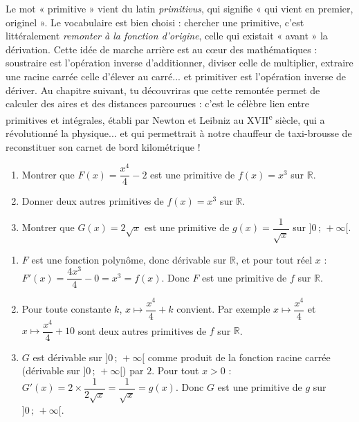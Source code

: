 \documentclass[11pt]{article}
\begin{document}
\begin{savaistu}
Le mot « primitive » vient du latin \emph{primitivus}, qui signifie « qui vient en premier, originel ». Le vocabulaire est bien choisi : chercher une primitive, c'est littéralement \emph{remonter à la fonction d'origine}, celle qui existait « avant » la dérivation. Cette idée de marche arrière est au cœur des mathématiques : soustraire est l'opération inverse d'additionner, diviser celle de multiplier, extraire une racine carrée celle d'élever au carré... et primitiver est l'opération inverse de dériver. Au chapitre suivant, tu découvriras que cette remontée permet de calculer des aires et des distances parcourues : c'est le célèbre lien entre primitives et intégrales, établi par Newton et Leibniz au XVII\textsuperscript{e} siècle, qui a révolutionné la physique... et qui permettrait à notre chauffeur de taxi-brousse de reconstituer son carnet de bord kilométrique !
\end{savaistu}

\begin{exercice}
\begin{enumerate}
\item Montrer que $F(x) = \dfrac{x^4}{4} - 2$ est une primitive de $f(x) = x^3$ sur $\mathbb{R}$.
\item Donner deux autres primitives de $f(x) = x^3$ sur $\mathbb{R}$.
\item Montrer que $G(x) = 2\sqrt{x}$ est une primitive de $g(x) = \dfrac{1}{\sqrt{x}}$ sur $]0\,;\,+\infty[$.
\end{enumerate}
\end{exercice}

\begin{corrige}
\begin{enumerate}
\item $F$ est une fonction polynôme, donc dérivable sur $\mathbb{R}$, et pour tout réel $x$ : $F'(x) = \dfrac{4x^3}{4} - 0 = x^3 = f(x)$. Donc $F$ est une primitive de $f$ sur $\mathbb{R}$.
\item Pour toute constante $k$, $x \mapsto \dfrac{x^4}{4} + k$ convient. Par exemple $x \mapsto \dfrac{x^4}{4}$ et $x \mapsto \dfrac{x^4}{4} + 10$ sont deux autres primitives de $f$ sur $\mathbb{R}$.
\item $G$ est dérivable sur $]0\,;\,+\infty[$ comme produit de la fonction racine carrée (dérivable sur $]0\,;\,+\infty[$) par $2$. Pour tout $x > 0$ : $G'(x) = 2 \times \dfrac{1}{2\sqrt{x}} = \dfrac{1}{\sqrt{x}} = g(x)$. Donc $G$ est une primitive de $g$ sur $]0\,;\,+\infty[$.
\end{enumerate}
\end{corrige}
\end{document}
